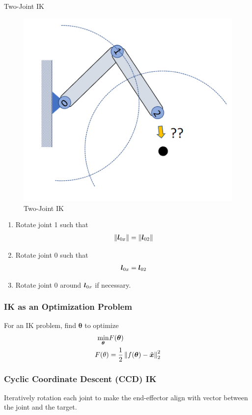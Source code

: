 \begin{example}
    Two-Joint IK
    \begin{figure}[!htb]
        \centering
        \includegraphics[width=0.618\linewidth]{pic/1053/Two-Joint IK}
        \caption{Two-Joint IK}
    \end{figure}
    
    \begin{enumerate}
        \item Rotate joint 1 such that
        \begin{align*}
            \left\lVert{\bm{l}}_{0x}\right\rVert=\left\lVert{\bm{l}}_{02}\right\rVert
        \end{align*}
        \item Rotate joint 0 such that
        \begin{align*}
            {\bm{l}}_{0x}={\bm{l}}_{02}
        \end{align*}
        \item Rotate joint 0 around ${\bm{l}}_{0x}$ if necessary.
    \end{enumerate}

\end{example}

\subsubsection{IK as an Optimization Problem}
For an IK problem, find $\bm\theta$ to optimize
\begin{align*}
    \min_{{\bm{\theta}}} &F({\bm{\theta}})\\
    F(\theta)&=\frac{1}{2}\left\lVert f({\bm{\theta}})-\tilde{{\bm{x}}}\right\rVert_2^2
\end{align*}

\subsubsection{Cyclic Coordinate Descent (CCD) IK}
Iteratively rotation each joint to make the end-effector align with vector between the joint and the target.

